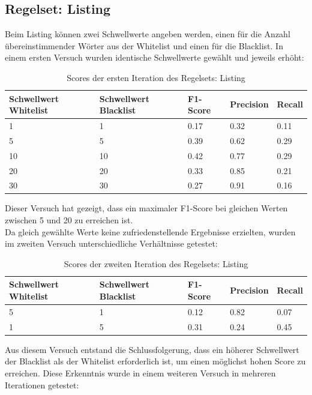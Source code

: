 \subsection{Regelset: Listing}
Beim Listing können zwei Schwellwerte angeben werden, einen für die Anzahl übereinstimmender Wörter aus der Whitelist und einen für die Blacklist.
In einem ersten Versuch wurden identische Schwellwerte gewählt und jeweils erhöht:\\
\begin{table}[H]
	\caption{Scores der ersten Iteration des Regelsets: Listing}
	\centering
\begin{tabular}{|l|l|l|l|l|}
	\hline
	Schwellwert Whitelist & Schwellwert Blacklist & F1-Score & Precision & Recall\\
	\hline
	1 & 1 & 0.17 & 0.32 & 0.11 \\
	5 & 5 & 0.39 & 0.62 & 0.29 \\
	10 & 10 & 0.42 & 0.77 & 0.29 \\
	20 & 20 & 0.33 & 0.85 & 0.21 \\
	30 & 30 & 0.27 & 0.91 & 0.16 \\
	\hline
\end{tabular}
\end{table}
Dieser Versuch hat gezeigt, dass ein maximaler F1-Score bei gleichen Werten zwischen 5 und 20 zu erreichen ist.\\
Da gleich gewählte Werte keine zufriedenstellende Ergebnisse erzielten, wurden im zweiten Versuch unterschiedliche Verhältnisse getestet:\\
\begin{table}[H]
	\caption{Scores der zweiten Iteration des Regelsets: Listing}
	\centering
\begin{tabular}{|l|l|l|l|l|}
	\hline
	Schwellwert Whitelist & Schwellwert Blacklist & F1-Score & Precision & Recall\\
	\hline
	5 & 1 & 0.12 & 0.82 & 0.07 \\
	1 & 5 & 0.31 & 0.24 & 0.45 \\
	\hline
\end{tabular}
\end{table}
Aus diesem Versuch entstand die Schlussfolgerung, dass ein höherer Schwellwert der Blacklist als der Whitelist erforderlich ist, um einen möglichst hohen Score zu erreichen.
Diese Erkenntnis wurde in einem weiteren Versuch in mehreren Iterationen getestet:\\
